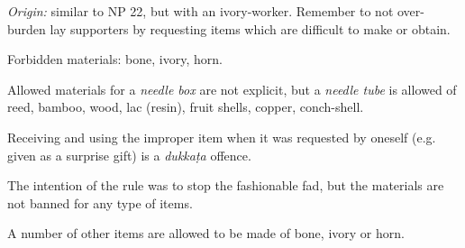 \emph{Origin:} similar to NP 22, but with an ivory-worker. Remember to
not over-burden lay supporters by requesting items which are difficult
to make or obtain.

Forbidden materials: bone, ivory, horn.

Allowed materials for a \emph{needle box} are not explicit, but a
\emph{needle tube} is allowed of reed, bamboo, wood, lac (resin), fruit
shells, copper, conch-shell.

Receiving and using the improper item when it was requested by oneself
(e.g. given as a surprise gift) is a \emph{dukkaṭa} offence.

The intention of the rule was to stop the fashionable fad, but the
materials are not banned for any type of items.

A number of other items are allowed to be made of bone, ivory or horn.


